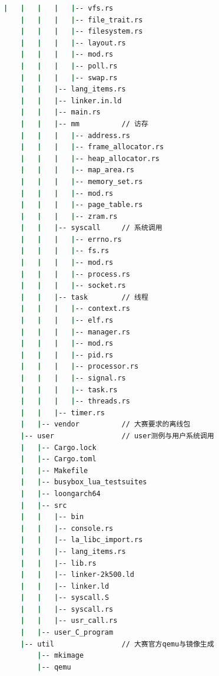 \begin{lstlisting}[language={bash}, label={code:content},
	caption={目录树}]
    |   |   |   |   |-- vfs.rs
    |   |   |   |-- file_trait.rs
    |   |   |   |-- filesystem.rs
    |   |   |   |-- layout.rs
    |   |   |   |-- mod.rs
    |   |   |   |-- poll.rs
    |   |   |   |-- swap.rs
    |   |   |-- lang_items.rs
    |   |   |-- linker.in.ld
    |   |   |-- main.rs
    |   |   |-- mm          // 访存
    |   |   |   |-- address.rs
    |   |   |   |-- frame_allocator.rs
    |   |   |   |-- heap_allocator.rs
    |   |   |   |-- map_area.rs
    |   |   |   |-- memory_set.rs
    |   |   |   |-- mod.rs
    |   |   |   |-- page_table.rs
    |   |   |   |-- zram.rs
    |   |   |-- syscall     // 系统调用
    |   |   |   |-- errno.rs
    |   |   |   |-- fs.rs
    |   |   |   |-- mod.rs
    |   |   |   |-- process.rs
    |   |   |   |-- socket.rs
    |   |   |-- task        // 线程
    |   |   |   |-- context.rs
    |   |   |   |-- elf.rs
    |   |   |   |-- manager.rs
    |   |   |   |-- mod.rs
    |   |   |   |-- pid.rs
    |   |   |   |-- processor.rs
    |   |   |   |-- signal.rs
    |   |   |   |-- task.rs
    |   |   |   |-- threads.rs
    |   |   |-- timer.rs
    |   |-- vendor          // 大赛要求的离线包
    |-- user                // user测例与用户系统调用
    |   |-- Cargo.lock
    |   |-- Cargo.toml
    |   |-- Makefile
    |   |-- busybox_lua_testsuites
    |   |-- loongarch64
    |   |-- src
    |   |   |-- bin
    |   |   |-- console.rs
    |   |   |-- la_libc_import.rs
    |   |   |-- lang_items.rs
    |   |   |-- lib.rs
    |   |   |-- linker-2k500.ld
    |   |   |-- linker.ld
    |   |   |-- syscall.S
    |   |   |-- syscall.rs
    |   |   |-- usr_call.rs
    |   |-- user_C_program
    |-- util                // 大赛官方qemu与镜像生成
        |-- mkimage
        |-- qemu
    
\end{lstlisting}